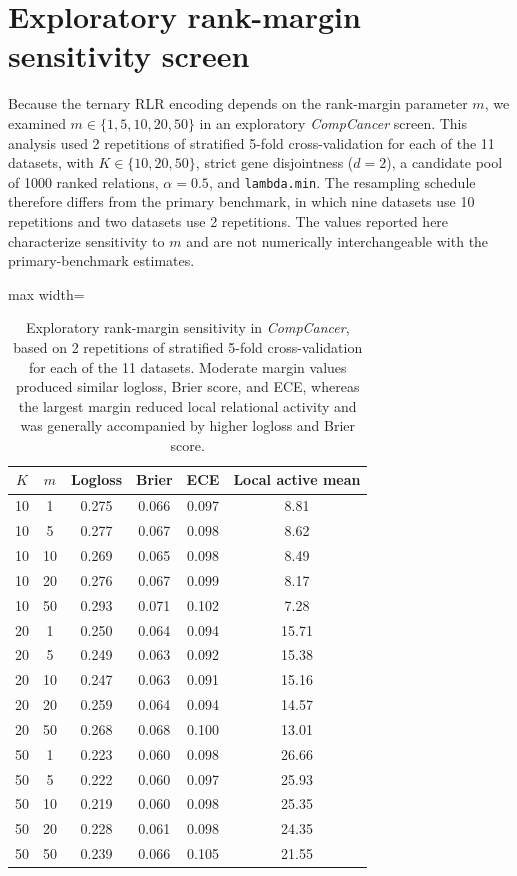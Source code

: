 \documentclass[11pt, a4paper]{article}
\newcommand{\stdtablefont}{\small}
\newcommand{\stdtablelayout}{%
  \stdtablefont
  \setlength{\tabcolsep}{4pt}
  \renewcommand{\arraystretch}{1.2}
}
\begin{document}
\section{Exploratory rank-margin sensitivity screen}

Because the ternary RLR encoding depends on the rank-margin parameter $m$, we examined $m\in\{1,5,10,20,50\}$ in an exploratory \emph{CompCancer} screen. This analysis used 2 repetitions of stratified 5-fold cross-validation for each of the 11 datasets, with $K\in\{10,20,50\}$, strict gene disjointness ($d=2$), a candidate pool of 1000 ranked relations, $\alpha=0.5$, and \texttt{lambda.min}. The resampling schedule therefore differs from the primary benchmark, in which nine datasets use 10 repetitions and two datasets use 2 repetitions. The values reported here characterize sensitivity to $m$ and are not numerically interchangeable with the primary-benchmark estimates.

\begin{table}[!htbp]
\centering
\caption{Exploratory rank-margin sensitivity in \emph{CompCancer}, based on 2 repetitions of stratified 5-fold cross-validation for each of the 11 datasets. Moderate margin values produced similar logloss, Brier score, and ECE, whereas the largest margin reduced local relational activity and was generally accompanied by higher logloss and Brier score.}
\label{tab:m_sensitivity_world}
{\stdtablelayout
\begin{adjustbox}{max width=\linewidth}
\begin{tabular}{cccccc}
\toprule
\textbf{$K$} & \textbf{$m$} & \textbf{Logloss} & \textbf{Brier} & \textbf{ECE} & \textbf{Local active mean} \\
\midrule
10 & 1  & 0.275 & 0.066 & 0.097 & 8.81 \\
10 & 5  & 0.277 & 0.067 & 0.098 & 8.62 \\
10 & 10 & 0.269 & 0.065 & 0.098 & 8.49 \\
10 & 20 & 0.276 & 0.067 & 0.099 & 8.17 \\
10 & 50 & 0.293 & 0.071 & 0.102 & 7.28 \\
\midrule
20 & 1  & 0.250 & 0.064 & 0.094 & 15.71 \\
20 & 5  & 0.249 & 0.063 & 0.092 & 15.38 \\
20 & 10 & 0.247 & 0.063 & 0.091 & 15.16 \\
20 & 20 & 0.259 & 0.064 & 0.094 & 14.57 \\
20 & 50 & 0.268 & 0.068 & 0.100 & 13.01 \\
\midrule
50 & 1  & 0.223 & 0.060 & 0.098 & 26.66 \\
50 & 5  & 0.222 & 0.060 & 0.097 & 25.93 \\
50 & 10 & 0.219 & 0.060 & 0.098 & 25.35 \\
50 & 20 & 0.228 & 0.061 & 0.098 & 24.35 \\
50 & 50 & 0.239 & 0.066 & 0.105 & 21.55 \\
\bottomrule
\end{tabular}
\end{adjustbox}
}
\end{table}
\end{document}
